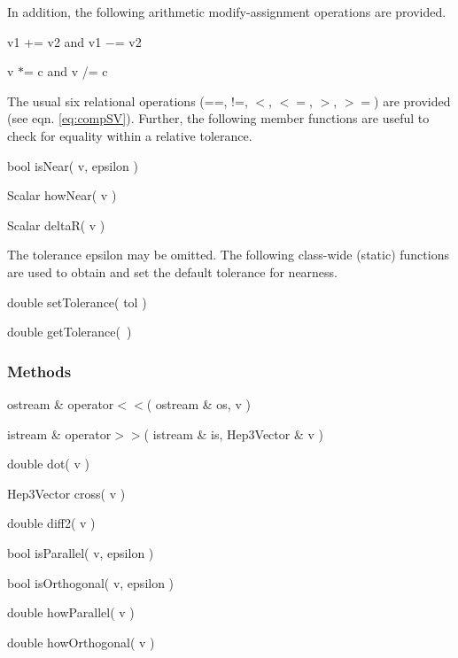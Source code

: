 \noindent
In addition, 
the following arithmetic modify-assignment operations are provided.

\begin{shortlist}
  \item v1 += v2  and  v1 $-$= v2
  \item v $*$= c  and  v /= c
\end{shortlist}

\noindent
The usual six relational operations
(==, !=, $<$, $<=$, $>$, $>=$) are provided (see eqn. \ref{eq:compSV}).
Further, the following member functions are useful to check for equality
within a relative tolerance.

\begin{shortlist}
  \item bool isNear( v, epsilon ) \see{\ref{eq:isNear}}
  \item Scalar howNear( v ) \see{\ref{eq:howNear}, \ref{eq:howNear:2}, \ref{eq:howNear:3}}
  \item Scalar deltaR( v ) \see{\ref{eq:deltaR}}
\end{shortlist}

\noindent
The tolerance epsilon may be omitted.
The following class-wide (static) functions are used
to obtain and set the default tolerance for nearness.

\begin{shortlist}
  \item double setTolerance( tol )	\see{\ref{eq:epsildef}}
  \item double getTolerance(~)
\end{shortlist}


\subsubsection{Methods}

\begin{shortlist}
  \item ostream \& operator$<<$( ostream \& os, v )
  \item istream \& operator$>>$( istream \& is, Hep3Vector \& v )
\end{shortlist}
\begin{shortlist}
  \item double dot( v ) \see{\ref{eq:dot}}
  \item Hep3Vector cross( v ) \see{\ref{eq:cross}}
  \item double diff2( v ) \see{\ref{eq:diff2}}
  \item bool isParallel( v, epsilon ) \see{\ref{eq:isPar}}
  \item bool isOrthogonal( v, epsilon ) \see{\ref{eq:isOrtho}}
  \item double howParallel( v ) \see{\ref{eq:howPar}, \ref{eq:howPar:2}}
  \item double howOrthogonal( v ) \see{\ref{eq:howOrtho}, \ref{eq:howOrtho:2}}
\end{shortlist}

